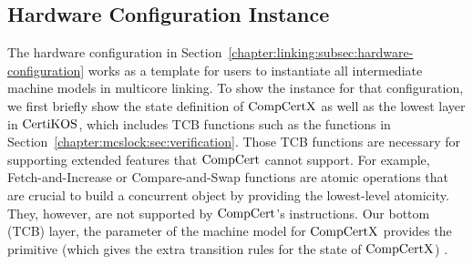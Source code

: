 
\subsection{Hardware Configuration Instance}
\label{chapter:certikos:subsec:hardware-configuration-instance}

The hardware configuration in Section~\ref{chapter:linking:subsec:hardware-configuration} works as a 
template for users to instantiate all intermediate machine models in multicore linking. 
To show the instance for that configuration,
we first briefly show the state definition of $\mathrm{CompCertX}$
as well as the lowest layer in $\mathrm{CertiKOS}$, which includes TCB functions such as the functions in Section~\ref{chapter:mcslock:sec:verification}.
Those TCB functions are 
necessary for supporting extended features that $\mathrm{CompCert}$ cannot support. 
For example, 
Fetch-and-Increase or Compare-and-Swap functions are atomic operations that are crucial to build a 
concurrent object by providing the lowest-level atomicity. 
They, however, are not supported by $\mathrm{CompCert}$'s instructions.
Our bottom (TCB) layer, the parameter of the machine model for $\mathrm{CompCertX}$ 
provides the primitive (which gives the extra transition rules for the state of $\mathrm{CompCertX}$) . 
%
%



